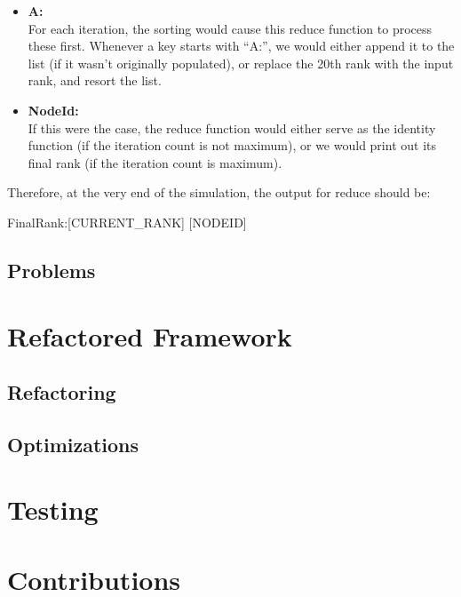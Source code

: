 \begin{itemize}
        \begin{itemize}
          \item \textbf{A:}\\
            For each iteration, the sorting would cause this reduce function to process these first. Whenever a key starts with ``A:'', we would either append it to the list (if it wasn't originally populated), or replace the 20th rank with the input rank, and resort the list.
          \item \textbf{NodeId:} \\
            If this were the case, the reduce function would either serve as the identity function (if the iteration count is not maximum), or we would print out its final rank (if the iteration count is maximum). 
        \end{itemize}

        Therefore, at the very end of the simulation, the output for reduce should be:
        \begin{center}
        FinalRank:[CURRENT\_RANK] \hspace{4mm} [NODEID]
        \end{center}
    \end{itemize}

\subsection*{Problems}

\section{Refactored Framework}
\subsection*{Refactoring}

\subsection*{Optimizations}

\section{Testing}

\section{Contributions}

